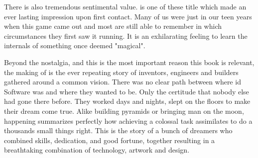  \par
There is also tremendous sentimental value. \doom{} is one of these title which made an ever lasting impression upon first contact. Many of us were just in our teen years when this game came out and most are still able to remember in which circumstances they first saw it running. It is an exhilarating feeling to learn the internals of something once deemed "magical".\\
\par


Beyond the nostalgia, and this is the most important reason this book is relevant, the making of \doom{} is the ever repeating story of inventors, engineers and builders gathered around a common vision. There was no clear path between where id Software was and where they wanted to be. Only the certitude that nobody else had gone there before. They worked days and nights, slept on the floors to make their dream come true. Alike building pyramids or bringing man on the moon, \doom{} happening summarizes perfectly how achieving a colossal task assimilates to do a thousands small things right. This is the story of a bunch of dreamers who combined skills, dedication, and good fortune, together resulting in a breathtaking combination of technology, artwork and design.\\
\par



